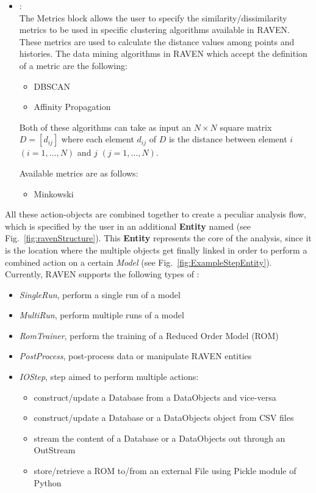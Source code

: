 \begin{itemize}
\begin{itemize}
    \end{itemize}
  \item \textit{}:
   \\
    The Metrics block allows the user to specify the similarity/dissimilarity metrics to be used in specific clustering algorithms available in RAVEN.
    These metrics are used to calculate the distance values among points and histories.
    The data mining algorithms in RAVEN which accept the definition of a metric are the following:
    \begin{itemize}
      \item DBSCAN 
      \item Affinity Propagation 
    \end{itemize}
    Both of these algorithms can take as input an $N \times N$ square matrix $D=[d_{ij}]$ where each element $d_{ij}$ of $D$ is the distance between 
    element $i$ $(i=1,\ldots,N)$ and $j$
    $(j=1,\ldots,N)$.

    Available metrics are as follows:
    \begin{itemize}
      \item Minkowski
    \end{itemize}
\end{itemize}
All these action-objects are combined together to create a peculiar analysis flow, which is specified
by the user in an additional \textbf{Entity} named \textit{} (see Fig.~\ref{fig:ravenStructure}).
This \textbf{Entity} represents the core of the analysis, since it is the location where the multiple objects get
finally linked in order to perform a combined action on a certain \textit{Model} (see Fig.~\ref{fig:ExampleStepEntity}).
Currently, RAVEN supports the following types of \textit{}:
\begin{itemize}
  \item \textit{SingleRun}, perform a single run of a model
  \item \textit{MultiRun}, perform multiple runs of a model
  \item \textit{RomTrainer}, perform the training of a Reduced Order Model (ROM)
  \item \textit{PostProcess}, post-process data or manipulate RAVEN entities
  \item \textit{IOStep}, step aimed to perform multiple actions:
  \begin{itemize}
    \item construct/update a Database from a DataObjects and vice-versa
    \item construct/update a Database or a DataObjects object from CSV files
    \item stream the content of a Database or a DataObjects out through an OutStream
    \item store/retrieve a ROM to/from an external File using Pickle module of Python
  \end{itemize}
\end{itemize}
